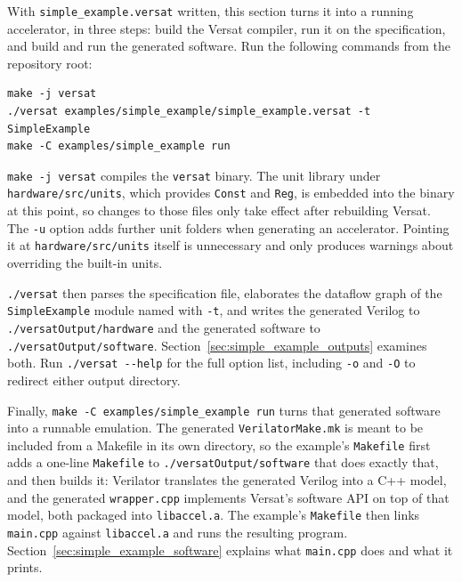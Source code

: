 %

With \texttt{simple\_example.versat} written, this section turns it into a running accelerator, in three steps: build the Versat compiler, run it on the specification, and build and run the generated software. Run the following commands from the repository root:

\begin{lstlisting}
make -j versat
./versat examples/simple_example/simple_example.versat -t SimpleExample
make -C examples/simple_example run
\end{lstlisting}

\texttt{make -j versat} compiles the \texttt{versat} binary. The unit library under \texttt{hardware/src/units}, which provides \texttt{Const} and \texttt{Reg}, is embedded into the binary at this point, so changes to those files only take effect after rebuilding Versat. The \texttt{-u} option adds further unit folders when generating an accelerator. Pointing it at \texttt{hardware/src/units} itself is unnecessary and only produces warnings about overriding the built-in units.

\texttt{./versat} then parses the specification file, elaborates the dataflow graph of the \texttt{SimpleExample} module named with \texttt{-t}, and writes the generated Verilog to \texttt{./versatOutput/hardware} and the generated software to \texttt{./versatOutput/software}. Section~\ref{sec:simple_example_outputs} examines both. Run \texttt{./versat -{}-help} for the full option list, including \texttt{-o} and \texttt{-O} to redirect either output directory.

Finally, \texttt{make -C examples/simple\_example run} turns that generated software into a runnable emulation. The generated \texttt{VerilatorMake.mk} is meant to be included from a Makefile in its own directory, so the example's \texttt{Makefile} first adds a one-line \texttt{Makefile} to \texttt{./versatOutput/software} that does exactly that, and then builds it: Verilator translates the generated Verilog into a C++ model, and the generated \texttt{wrapper.cpp} implements Versat's software API on top of that model, both packaged into \texttt{libaccel.a}. The example's \texttt{Makefile} then links \texttt{main.cpp} against \texttt{libaccel.a} and runs the resulting program. Section~\ref{sec:simple_example_software} explains what \texttt{main.cpp} does and what it prints.
